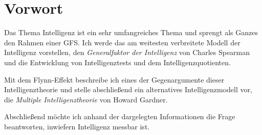\chapter{Vorwort}
Das Thema Intelligenz ist ein sehr umfangreiches Thema und sprengt als Ganzes den Rahmen einer GFS. Ich werde das am weitesten verbreitete Modell der Intelligenz vorstellen, den \emph{Generalfaktor der Intelligenz} von Charles Spearman und die Entwicklung von Intelligenztests und dem Intelligenzquotienten.

Mit dem Flynn-Effekt beschreibe ich eines der Gegenargumente dieser Intelligenztheorie und stelle abschließend ein alternatives Intelligenzmodell vor, die \emph{Multiple Intelligenztheorie} von Howard Gardner.

Abschließend möchte ich anhand der dargelegten Informationen die Frage beantworten, inwiefern Intelligenz messbar ist.
